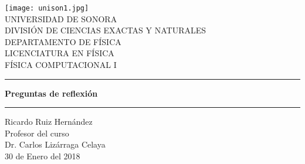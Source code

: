 \documentclass{article}
\begin{document}
\begin{center}
\texttt{[image: unison1.jpg]}
\\
\vspace{0.5cm}
UNIVERSIDAD DE SONORA \\
\vspace{0.5cm}
DIVISIÓN DE CIENCIAS EXACTAS Y NATURALES \\
\vspace{0.5cm}
DEPARTAMENTO DE FÍSICA\\
\vspace{0.5cm}
LICENCIATURA EN FÍSICA\\
\vspace{0.5cm}
FÍSICA COMPUTACIONAL I

\vspace{2 cm}
\hrule
\vspace{1 cm}

{\huge \bfseries {Preguntas de reflexión}}
\\

\vspace{1 cm}
\hrule
\vspace{2 cm}
Ricardo Ruiz Hernández\\ 
\vspace{1 cm}
Profesor del curso\\
Dr. Carlos Lizárraga Celaya\\
\vspace{2 cm}
30 de Enero del 2018
\end{center}
\end{document}
